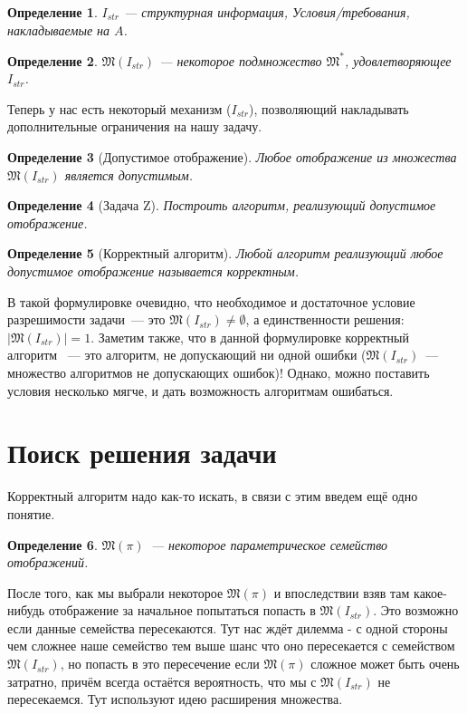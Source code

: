 \documentclass[a4paper, 12pt]{report}
\newtheorem*{definition}{Определение}
\begin{document}
\begin{definition} 
$I_{str}$ --- структурная информация, Условия/требования, накладываемые на $A$. 
\end{definition}

\begin{definition} 
$\mathfrak{M}(I_{str})$ --- некоторое подмножество $\mathfrak{M}^*$, удовлетворяющее $I_{str}$. 
\end{definition}

Теперь у нас есть некоторый механизм ($I_{str}$), позволяющий накладывать дополнительные ограничения на нашу задачу.

\begin{definition}[Допустимое отображение]
Любое отображение из множества $\mathfrak{M}(I_{str})$ является допустимым. 
\end{definition}

\begin{definition}[Задача Z] 
Построить алгоритм, реализующий допустимое отображение. \end{definition}

\begin{definition}[Корректный алгоритм] 
\emph{Любой} алгоритм реализующий \emph{любое} допустимое отображение называется корректным. 
\end{definition}

В такой формулировке очевидно, что необходимое и достаточное условие разрешимости задачи~--- это $\mathfrak{M}(I_{str})\neq\emptyset$, а единственности решения: $|\mathfrak{M}(I_{str})| = 1$. Заметим также, что в данной формулировке корректный алгоритм~ --- это алгоритм, не допускающий ни одной ошибки ($\mathfrak{M}(I_{str})$~--- множество алгоритмов не допускающих ошибок)! Однако, можно поставить условия несколько мягче, и дать возможность алгоритмам ошибаться.

\section{Поиск решения задачи}
Корректный алгоритм надо как-то искать, в связи с этим введем ещё одно понятие.

\begin{definition} 
$\mathfrak{M}(\pi)$~--- некоторое параметрическое семейство отображений. 
\end{definition}

После того, как мы выбрали некоторое $\mathfrak{M}(\pi)$ и впоследствии взяв там какое-нибудь отображение за начальное попытаться попасть в $\mathfrak{M}(I_{str})$. Это возможно если данные семейства пересекаются. Тут нас ждёт дилемма - с одной стороны чем сложнее наше семейство тем выше шанс что оно пересекается с семейством $\mathfrak{M}(I_{str})$, но попасть в это пересечение если $\mathfrak{M}(\pi)$ сложное может быть очень затратно, причём всегда остаётся вероятность, что мы с $\mathfrak{M}(I_{str})$ не пересекаемся. Тут используют идею расширения множества.
\end{document}
